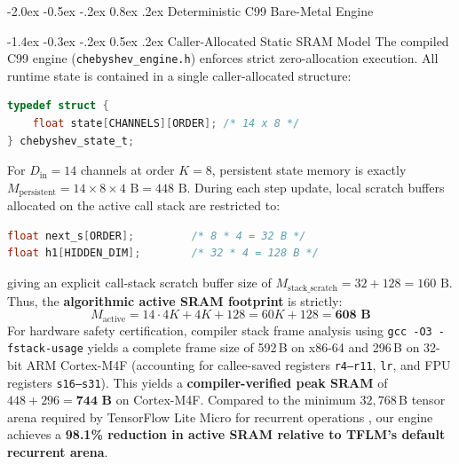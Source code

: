 \documentclass[10pt,twocolumn,a4paper]{article}
\makeatletter
\renewcommand\section{\@startsection{section}{1}{\z@}%
  {-2.0ex \@plus -0.5ex \@minus -.2ex}%
  {0.8ex \@plus .2ex}%
  {\normalfont\large\bfseries}}
\renewcommand\subsection{\@startsection{subsection}{2}{\z@}%
  {-1.4ex \@plus -0.3ex \@minus -.2ex}%
  {0.5ex \@plus .2ex}%
  {\normalfont\normalsize\bfseries}}
\theoremstyle{plain}
\theoremstyle{definition}
\makeatother
\begin{document}
\section{Deterministic C99 Bare-Metal Engine}

\subsection{Caller-Allocated Static SRAM Model}
The compiled C99 engine (\texttt{chebyshev\_engine.h}) enforces strict zero-allocation execution. All runtime state is contained in a single caller-allocated structure:
\begin{lstlisting}[language=C]
typedef struct {
    float state[CHANNELS][ORDER]; /* 14 x 8 */
} chebyshev_state_t;
\end{lstlisting}
For $D_{\mathrm{in}} = 14$ channels at order $K = 8$, persistent state memory is exactly $M_{\mathrm{persistent}} = 14 \times 8 \times 4\text{ B} = 448\text{ B}$. During each step update, local scratch buffers allocated on the active call stack are restricted to:
\begin{lstlisting}[language=C]
float next_s[ORDER];         /* 8 * 4 = 32 B */
float h1[HIDDEN_DIM];        /* 32 * 4 = 128 B */
\end{lstlisting}
giving an explicit call-stack scratch buffer size of $M_{\mathrm{stack\_scratch}} = 32 + 128 = 160\text{ B}$. Thus, the \textbf{algorithmic active SRAM footprint} is strictly:
\begin{equation}
M_{\mathrm{active}} = 14 \cdot 4K + 4K + 128 = 60K + 128 = \mathbf{608\text{ B}}
\end{equation}
For hardware safety certification, compiler stack frame analysis using \texttt{gcc -O3 -fstack-usage} yields a complete frame size of 592\,B on x86-64 and 296\,B on 32-bit ARM Cortex-M4F (accounting for callee-saved registers \texttt{r4--r11}, \texttt{lr}, and FPU registers \texttt{s16--s31}). This yields a \textbf{compiler-verified peak SRAM} of $448 + 296 = \mathbf{744\text{ B}}$ on Cortex-M4F. Compared to the minimum $32{,}768$\,B tensor arena required by TensorFlow Lite Micro for recurrent operations \cite{david2021tensorflow}, our engine achieves a \textbf{98.1\% reduction in active SRAM relative to TFLM's default recurrent arena}.
\end{document}
